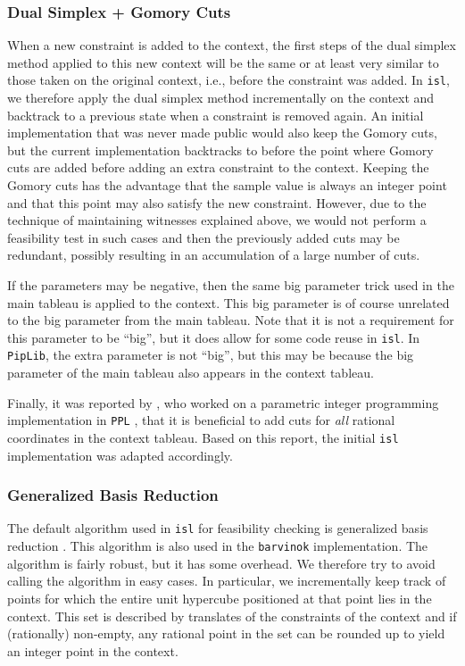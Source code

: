 \subsubsection{Dual Simplex + Gomory Cuts}

When a new constraint is added to the context, the first steps
of the dual simplex method applied to this new context will be the same
or at least very similar to those taken on the original context, i.e.,
before the constraint was added.  In {\tt isl}, we therefore apply
the dual simplex method incrementally on the context and backtrack
to a previous state when a constraint is removed again.
An initial implementation that was never made public would also
keep the Gomory cuts, but the current implementation backtracks
to before the point where Gomory cuts are added before adding
an extra constraint to the context.
Keeping the Gomory cuts has the advantage that the sample value
is always an integer point and that this point may also satisfy
the new constraint.  However, due to the technique of maintaining
witnesses explained above,
we would not perform a feasibility test in such cases and then
the previously added cuts may be redundant, possibly resulting
in an accumulation of a large number of cuts.

If the parameters may be negative, then the same big parameter trick
used in the main tableau is applied to the context.  This big parameter
is of course unrelated to the big parameter from the main tableau.
Note that it is not a requirement for this parameter to be ``big'',
but it does allow for some code reuse in {\tt isl}.
In {\tt PipLib}, the extra parameter is not ``big'', but this may be because
the big parameter of the main tableau also appears
in the context tableau.

Finally, it was reported by \textcite{Galea2009personal}, who
worked on a parametric integer programming implementation
in {\tt PPL} \parencite{PPL},
that it is beneficial to add cuts for \emph{all} rational coordinates
in the context tableau.  Based on this report,
the initial {\tt isl} implementation was adapted accordingly.

\subsubsection{Generalized Basis Reduction}\label{s:GBR}

The default algorithm used in {\tt isl} for feasibility checking
is generalized basis reduction \parencite{Cook1991implementation}.
This algorithm is also used in the {\tt barvinok} implementation.
The algorithm is fairly robust, but it has some overhead.
We therefore try to avoid calling the algorithm in easy cases.
In particular, we incrementally keep track of points for which
the entire unit hypercube positioned at that point lies in the context.
This set is described by translates of the constraints of the context
and if (rationally) non-empty, any rational point
in the set can be rounded up to yield an integer point in the context.

